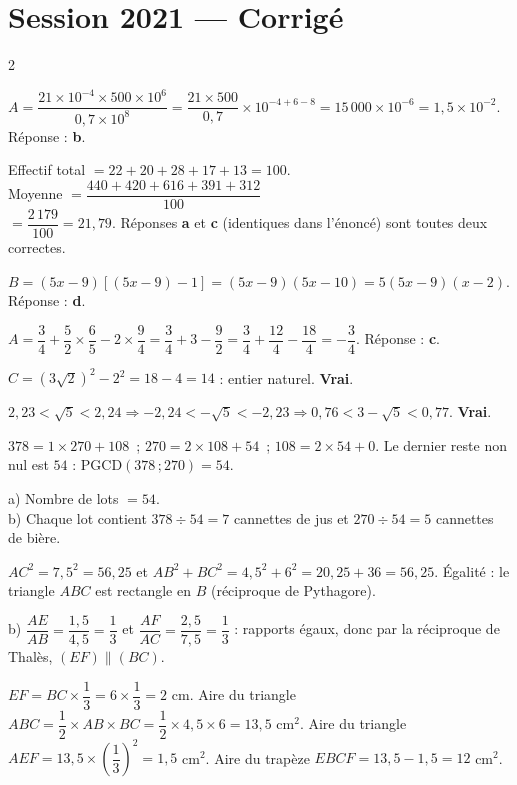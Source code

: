 \section{Session 2021 — Corrigé}
\begin{multicols}{2}

$A=\dfrac{21\times10^{-4}\times500\times10^{6}}{0{,}7\times10^{8}}=\dfrac{21\times500}{0{,}7}\times10^{-4+6-8}=15\,000\times10^{-6}=1{,}5\times10^{-2}$.
Réponse : \textbf{b}.

Effectif total $=22+20+28+17+13=100$.\\
Moyenne $=\dfrac{440+420+616+391+312}{100}$\\
$=\dfrac{2\,179}{100}=21{,}79$.
Réponses \textbf{a} et \textbf{c} (identiques dans l'énoncé) sont toutes deux correctes.

$B=(5x-9)[(5x-9)-1]=(5x-9)(5x-10)=5(5x-9)(x-2)$. Réponse : \textbf{d}.

$A=\dfrac34+\dfrac52\times\dfrac65-2\times\dfrac94=\dfrac34+3-\dfrac92=\dfrac34+\dfrac{12}4-\dfrac{18}4=-\dfrac34$.
Réponse : \textbf{c}.

$C=(3\sqrt2)^{2}-2^{2}=18-4=14$ : entier naturel. \textbf{Vrai}.

$2{,}23<\sqrt5<2{,}24\Rightarrow-2{,}24<-\sqrt5<-2{,}23\Rightarrow0{,}76<3-\sqrt5<0{,}77$.
\textbf{Vrai}.

$378=1\times270+108$~; $270=2\times108+54$~; $108=2\times54+0$. Le dernier reste non nul est
$54$ : $\text{PGCD}(378\,;270)=54$.

a) Nombre de lots $=54$. \\
b) Chaque lot contient $378\div54=7$ cannettes de jus et $270\div54=5$ cannettes de bière.

$AC^{2}=7{,}5^{2}=56{,}25$ et $AB^{2}+BC^{2}=4{,}5^{2}+6^{2}=20{,}25+36=56{,}25$. Égalité :
le triangle $ABC$ est rectangle en $B$ (réciproque de Pythagore).

b) $\dfrac{AE}{AB}=\dfrac{1{,}5}{4{,}5}=\dfrac13$ et $\dfrac{AF}{AC}=\dfrac{2{,}5}{7{,}5}=\dfrac13$ :
rapports égaux, donc par la réciproque de Thalès, $(EF)\parallel(BC)$.

$EF=BC\times\dfrac13=6\times\dfrac13=2$ cm. Aire du triangle $ABC=\dfrac12\times AB\times BC=\dfrac12\times4{,}5\times6=13{,}5$ cm$^{2}$.
Aire du triangle $AEF=13{,}5\times\left(\dfrac13\right)^{2}=1{,}5$ cm$^{2}$. Aire du trapèze
$EBCF=13{,}5-1{,}5=12$ cm$^{2}$.


\end{multicols}
